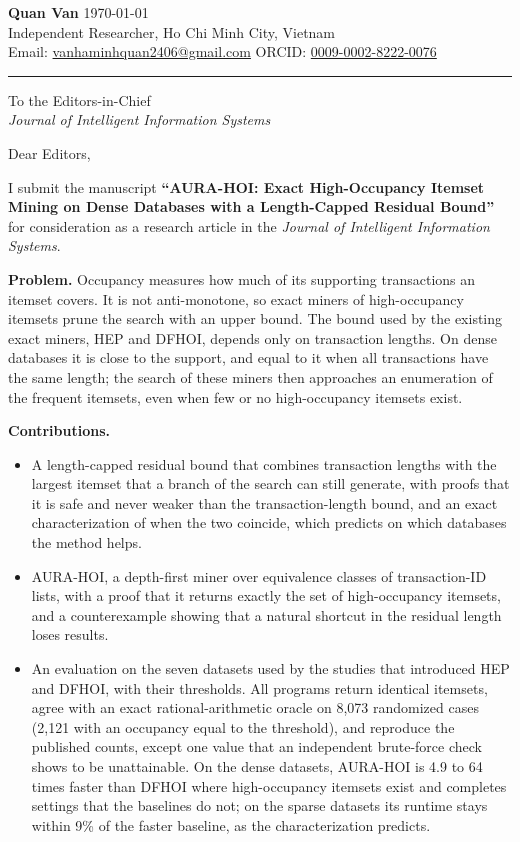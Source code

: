 \documentclass[11pt,a4paper]{article}
\begin{document}
\textbf{Quan Van} \hfill \today \\
Independent Researcher, Ho Chi Minh City, Vietnam \\
Email: \href{mailto:vanhaminhquan2406@gmail.com}{vanhaminhquan2406@gmail.com} \quad ORCID: \href{https://orcid.org/0009-0002-8222-0076}{0009-0002-8222-0076}

\vspace{0.4em}
\hrule
\vspace{0.4em}

\newcommand{\journal}{Journal of Intelligent Information Systems}
To the Editors-in-Chief \\
\textit{\journal}

Dear Editors,

I submit the manuscript \textbf{``AURA-HOI: Exact High-Occupancy Itemset Mining on Dense Databases with a Length-Capped Residual Bound''} for consideration as a research article in the \textit{\journal}.

\textbf{Problem.} Occupancy measures how much of its supporting transactions an itemset covers. It is not anti-monotone, so exact miners of high-occupancy itemsets prune the search with an upper bound. The bound used by the existing exact miners, HEP and DFHOI, depends only on transaction lengths. On dense databases it is close to the support, and equal to it when all transactions have the same length; the search of these miners then approaches an enumeration of the frequent itemsets, even when few or no high-occupancy itemsets exist.

\textbf{Contributions.}
\begin{itemize}\setlength{\itemsep}{2pt}
\item A length-capped residual bound that combines transaction lengths with the largest itemset that a branch of the search can still generate, with proofs that it is safe and never weaker than the transaction-length bound, and an exact characterization of when the two coincide, which predicts on which databases the method helps.
\item AURA-HOI, a depth-first miner over equivalence classes of transaction-ID lists, with a proof that it returns exactly the set of high-occupancy itemsets, and a counterexample showing that a natural shortcut in the residual length loses results.
\item An evaluation on the seven datasets used by the studies that introduced HEP and DFHOI, with their thresholds. All programs return identical itemsets, agree with an exact rational-arithmetic oracle on 8,073 randomized cases (2,121 with an occupancy equal to the threshold), and reproduce the published counts, except one value that an independent brute-force check shows to be unattainable. On the dense datasets, AURA-HOI is 4.9 to 64 times faster than DFHOI where high-occupancy itemsets exist and completes settings that the baselines do not; on the sparse datasets its runtime stays within 9\% of the faster baseline, as the characterization predicts.
\end{itemize}
\end{document}
